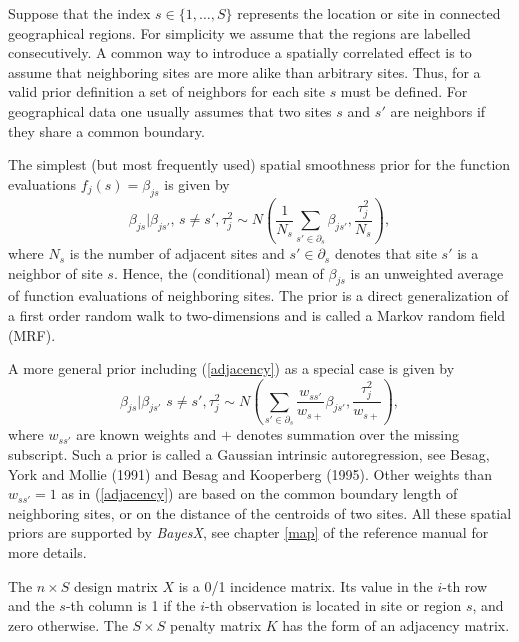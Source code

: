 \documentclass[11pt,a4paper,twoside]{bayesxarticle}
\begin{document}
Suppose that the index $s \in \{ 1,\dots,S \}$ represents the
location or site in connected geographical regions. For simplicity
we assume that the regions are labelled consecutively. A common way
to introduce a spatially correlated effect is to assume that
neighboring sites are more alike than arbitrary sites. Thus, for a
valid prior definition a set of neighbors for each site $s$ must be
defined. For geographical data one usually assumes that two sites
$s$ and $s'$ are neighbors if they share a common boundary.

The simplest (but most frequently used) spatial smoothness prior for
the function evaluations $f_j(s)=\beta_{js}$ is given by
\begin{equation}
\label{adjacency} \beta_{js} | \beta_{js'}, \, {s \neq
s'},\tau_j^2 \sim N \left( \frac{1}{N_s} \sum_{s' \in \partial_s}
\beta_{js'} , \frac{\tau_j^2}{N_s} \right),
\end{equation}
where $N_s$ is the number of adjacent sites and $s' \in
\partial_s$ denotes that site $s'$ is a neighbor of site $s$. Hence,
the (conditional) mean of $\beta_{js}$ is an unweighted average of
function evaluations of neighboring sites. The prior is a direct
generalization of a first order random walk to two-dimensions and is
called a Markov random field (MRF).

A more general prior including (\ref{adjacency}) as a special case
is given by
\begin{equation}
\label{intrinsic} \beta_{js} | \beta_{js'} \, \, {s \neq
s'},\tau_j^2 \sim N \left( \sum_{s' \in \partial_s}
\frac{w_{ss'}}{w_{s+}} \beta_{js'}, \frac{\tau_j^2}{w_{s+}} \right),
\end{equation}
where $w_{ss'}$ are known weights and $+$ denotes summation over the
missing subscript. Such a prior is called a Gaussian intrinsic
autoregression, see Besag, York and Mollie (1991) and Besag and
Kooperberg (1995). Other weights than $w_{ss'} = 1$ as in
(\ref{adjacency}) are based on the common boundary length of
neighboring sites, or on the distance of the centroids of two sites.
All these spatial priors are supported by {\em BayesX}, see chapter
\ref*{map} of the reference manual for more details.

The $n \times S$ design matrix $X$ is a 0/1 incidence matrix. Its
value in the $i$-th row and the $s$-th column is 1 if the $i$-th
observation is located in site or region $s$, and zero otherwise.
The $S \times S$ penalty matrix $K$ has the form of an adjacency
matrix.
\end{document}
